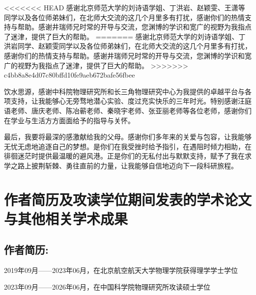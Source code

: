 <<<<<<< HEAD
感谢北京师范大学的刘诗语学姐、丁洪岩、赵颖雯、王潇等同学以及各位师弟妹们，在北师大交流的这几个月里多有打扰，感谢你们的热情支持与帮助。感谢井瑞师兄时常的开导与交流，您渊博的学识和宽广的视野为我指点了迷津，提供了巨大的帮助。
=======
感谢北京师范大学的刘诗语学姐、丁洪岩同学、赵颖雯同学以及各位师弟妹们，在北师大交流的这几个月里多有打扰，感谢你们的热情支持与帮助。感谢井瑞师兄时常的开导与交流，您渊博的学识和宽广的视野为我指点了迷津，提供了巨大的帮助。
>>>>>>> c4bb8a8e4d07c80bffd10fe9aeb672bafe56fbee

饮水思源，感谢中科院物理研究所和长三角物理研究中心为我提供的卓越平台与各项支持，让我能够心无旁骛地潜心实验、度过充实快乐的三年时光。特别感谢汪庭语老师、唐庆老师、陈冶蕲老师、秦晓宇老师、张亚丽老师等各位老师，感谢你们在学业与生活方方面面给予的指导与关怀。

最后，我要将最深的感激献给我的父母。感谢你们多年来的关爱与包容，让我能够无忧无虑地追逐自己的梦想。是你们在我受挫时给予指引，在遇阻时倾力相助，在徘徊迷茫时提供最温暖的避风港。正是你们的无私付出与默默支持，赋予了我在求学之路上披荆斩棘、勇往直前的力量，让我能够自信地迈向下一段科研旅程。




\chapter{作者简历及攻读学位期间发表的学术论文与其他相关学术成果}

\section*{作者简历:}
2019年09月——2023年06月，在北京航空航天大学物理学院获得理学学士学位

2023年09月——2026年06月，在中国科学院物理研究所攻读硕士学位


